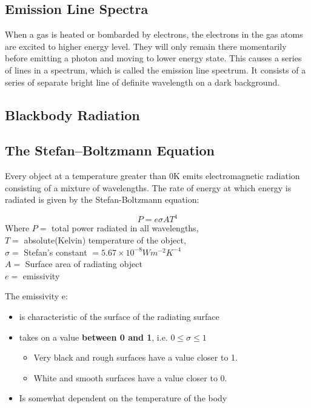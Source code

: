 \subsection{Emission Line Spectra}
When a gas is heated or bombarded by electrons, the electrons in the gas atoms are excited to higher energy level. They will only remain there momentarily before emitting a photon and moving to lower energy state. This causes a series of lines in a spectrum, which is called the emission line spectrum. It consists of a series of separate bright line of definite wavelength on a dark background.

\subsection{Blackbody Radiation}
\subsection*{The Stefan--Boltzmann Equation}

Every object at a temperature greater than 0K emits electromagnetic radiation consisting of a mixture of wavelengths. The rate of energy at which energy is radiated is given by the Stefan-Boltzmann equation:
\begin{form}
 $$P=e\sigma AT^4$$
 Where $P =$ total power radiated in all wavelengths, \\
 $T =$ absolute(Kelvin) temperature of the object, \\
 $\sigma =$ Stefan's constant $= 5.67 \times 10^{-8} W m^{-2} K^{-4}$\\
 $A =$ Surface area of radiating object\\
 $e =$ emissivity
\end{form} 
 The emissivity e:
 \begin{itemize}
 \item is characteristic of the surface of the radiating surface
 \item takes on a value \textbf{between 0 and 1}, i.e. $0\le \sigma \le1$
 \begin{itemize}
 \item Very black and rough surfaces have a value closer to 1.
  \item White and smooth surfaces have a value closer to 0.
 \end{itemize}
  \item Is somewhat dependent on the temperature of the body
 \end{itemize}
 
